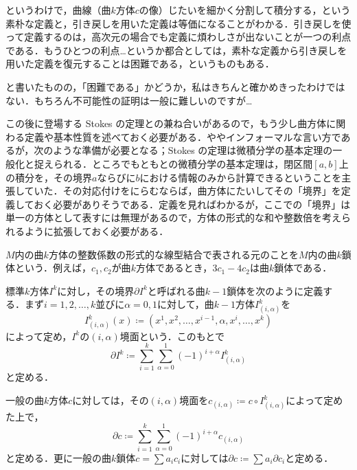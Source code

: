 というわけで，曲線（曲$k$方体$c$の像）じたいを細かく分割して積分する，という素朴な定義と，引き戻しを用いた定義は等価になることがわかる．引き戻しを使って定義するのは，高次元の場合でも定義に煩わしさが出ないことが一つの利点である．もうひとつの利点…というか都合としては，素朴な定義から引き戻しを用いた定義を復元することは困難である，というものもある．

\begin{que}[*]
と書いたものの，「困難である」かどうか，私はきちんと確かめきったわけではない．もちろん不可能性の証明は一般に難しいのですが…
\end{que}

この後に登場する Stokes の定理との兼ね合いがあるので，もう少し曲方体に関わる定義や基本性質を述べておく必要がある．ややインフォーマルな言い方であるが，次のような準備が必要となる；Stokes の定理は微積分学の基本定理の一般化と捉えられる．ところでもともとの微積分学の基本定理は，閉区間$[a,b]$上の積分を，その境界$a$ならびに$b$における情報のみから計算できるということを主張していた．その対応付けをにらむならば，曲方体にたいしてその「境界」を定義しておく必要がありそうである．定義を見ればわかるが，ここでの「境界」は単一の方体として表すには無理があるので，方体の形式的な和や整数倍を考えられるように拡張しておく必要がある．

\begin{defi}
$M$内の曲$k$方体の整数係数の形式的な線型結合で表される元のことを$M$内の曲$k$鎖体という．例えば，$c_1, c_2$が曲$k$方体であるとき，$3c_1 -4c_2$は曲$k$鎖体である．

標準$k$方体$I^k$に対し，その境界$\partial I^k$と呼ばれる曲$k-1$鎖体を次のように定義する．まず$i = 1, 2, \dots, k$並びに$\alpha = 0,1$に対して，曲$k-1$方体$I^k_{(i,\alpha)}$を
\begin{equation}
I^k_{(i,\alpha)}(x) \coloneqq (x^1, x^2, \dots, x^{i-1}, \alpha, x^{i}, \dots, x^k)
\end{equation}によって定め，$I^k$の$(i, \alpha)$境面という．このもとで
\begin{equation}
\partial I^k \coloneqq \sum_{i=1}^k \sum_{\alpha = 0}^1 (-1)^{i+\alpha} I^k_{(i,\alpha)}
\end{equation}と定める．

一般の曲$k$方体$c$に対しては，その$(i, \alpha)$境面を$c_{(i, \alpha)} \coloneqq c \circ I^k_{(i, \alpha)}$によって定めた上で，
\begin{equation}
\partial c \coloneqq \sum_{i=1}^k \sum_{\alpha = 0}^1 (-1)^{i+\alpha} c_{(i,\alpha)}
\end{equation}と定める．更に一般の曲$k$鎖体$c = \sum a_i c_i$に対しては$\partial c \coloneqq \sum a_i \partial c_i$と定める．
\end{defi}

